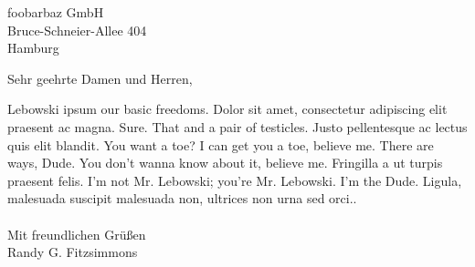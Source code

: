 \documentclass[11pt, a4paper]{scrlttr2}
\begin{document}
\sffamily

\begin{letter}{foobarbaz GmbH\\Bruce-Schneier-Allee 404\\Hamburg}

\opening{Sehr geehrte Damen und Herren,}
Lebowski ipsum our basic freedoms. Dolor sit amet, consectetur adipiscing elit praesent ac magna. 
Sure. That and a pair of testicles. Justo pellentesque ac lectus quis elit blandit. You want a toe? 
I can get you a toe, believe me. There are ways, Dude. You don't wanna know about it, believe me.
Fringilla a ut turpis praesent felis. I'm not Mr. Lebowski; you're Mr. Lebowski. I'm the Dude.
Ligula, malesuada suscipit malesuada non, ultrices non urna sed orci..
\\
\\
Mit freundlichen Grüßen \\
\newline
\mbox 
\newline
Randy G. Fitzsimmons

\end{letter}
\end{document}
